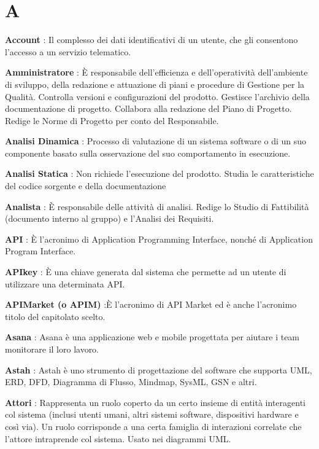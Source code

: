 \documentclass[12pt,a4paper,titlepage]{article}
\begin{document}
\newpage	

\section{A}
\begin{trivlist}
\item \textbf{Account} : Il complesso dei dati identificativi di un utente, che gli consentono l'accesso a un servizio telematico.
\item \textbf{Amministratore} : È responsabile dell'efficienza e dell'operatività dell'ambiente di sviluppo, della redazione e attuazione di piani e procedure di Gestione per la Qualità. Controlla versioni e configurazioni del prodotto. Gestisce l'archivio della documentazione di progetto. Collabora alla redazione del Piano di Progetto. Redige le Norme di Progetto per conto del Responsabile.
\item \textbf{Analisi Dinamica} : Processo di valutazione di un sistema software o di un suo componente basato sulla osservazione del suo comportamento in esecuzione.
\item \textbf{Analisi Statica} : Non richiede l'esecuzione del prodotto. Studia le caratteristiche del codice sorgente e della documentazione
\item \textbf{Analista} : È responsabile delle attività di analisi. Redige lo Studio di Fattibilità (documento interno al gruppo) e l'Analisi dei Requisiti.
\item \textbf{API} : È l'acronimo di Application Programming Interface, nonché di Application Program Interface.
\item \textbf{APIkey} : È una chiave generata dal sistema che permette ad un utente di utilizzare una determinata API.
\item \textbf{APIMarket (o APIM)} :È l'acronimo di API Market ed è anche l'acronimo titolo del capitolato scelto.
\item \textbf{Asana} : Asana è una applicazione web e mobile progettata per aiutare i team monitorare il loro lavoro.
\item \textbf{Astah} : Astah è uno strumento di progettazione del software che supporta UML, ERD, DFD, Diagramma di Flusso, Mindmap, SysML, GSN e altri.
\item \textbf{Attori} : Rappresenta un ruolo coperto da un certo insieme di entità interagenti col sistema (inclusi utenti umani, altri sistemi software, dispositivi hardware e così via). Un ruolo corrisponde a una certa famiglia di interazioni correlate che l'attore intraprende col sistema. Usato nei diagrammi UML.
\end{trivlist}
\end{document}
